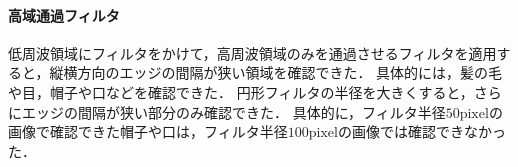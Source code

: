 \paragraph{高域通過フィルタ}
低周波領域にフィルタをかけて，高周波領域のみを通過させるフィルタを適用すると，縦横方向のエッジの間隔が狭い領域を確認できた．
具体的には，髪の毛や目，帽子や口などを確認できた．
円形フィルタの半径を大きくすると，さらにエッジの間隔が狭い部分のみ確認できた．
具体的に，フィルタ半径\(50\textrm{pixel}\)の画像で確認できた帽子や口は，フィルタ半径\(100\textrm{pixel}\)の画像では確認できなかった．